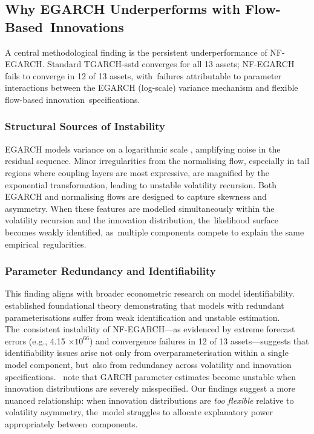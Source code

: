 \documentclass[risks,article,accept,pdftex,moreauthors]{Definitions/mdpi}
\begin{document}
\subsection{Why EGARCH Underperforms with Flow-Based~Innovations}
A central methodological finding is the persistent underperformance of NF-EGARCH. Standard TGARCH-sstd converges for all 13 assets; NF-EGARCH fails to converge in 12 of 13 assets, with~failures attributable to parameter interactions between the EGARCH (log-scale) variance mechanism and flexible flow-based innovation~specifications.

\subsubsection{{{Structural} %
 Sources of Instability}}
EGARCH models variance on a logarithmic scale \citep{nelson1991conditional}, amplifying noise in the residual sequence. Minor irregularities from the normalising flow, especially in tail regions where coupling layers are most expressive, are magnified by the exponential transformation, leading to unstable volatility recursion. Both EGARCH and normalising flows are designed to capture skewness and asymmetry. When these features are modelled simultaneously within the volatility recursion and the innovation distribution, the~likelihood surface becomes weakly identified, as~multiple components compete to explain the same empirical~regularities.

\subsubsection{{Parameter Redundancy and Identifiability}}
This finding aligns with broader econometric research on model identifiability.~\cite{rothenberg1971identification} established foundational theory demonstrating that models with redundant parameterisations suffer from weak identification and unstable estimation. The~consistent instability of NF-EGARCH—as evidenced by extreme forecast errors (e.g., {4.15 $\times 10^{66}$)} %
and convergence failures in 12 of 13 assets—suggests that identifiability issues arise not only from overparameterisation within a single model component, but~also from redundancy across volatility and innovation specifications.~\cite{francq2010garch} note that GARCH parameter estimates become unstable when innovation distributions are severely misspecified. Our findings suggest a more nuanced relationship: when innovation distributions are \emph{too flexible} relative to volatility asymmetry, the~model struggles to allocate explanatory power appropriately between~components.
\end{document}
